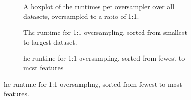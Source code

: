 \begin{figure}[h!]
\centering
\begin{subfigure}[b]{0.7\textwidth}
    \centering
    
    \caption{A boxplot of the runtimes per oversampler over all datasets, oversampled to a ratio of 1:1.}
    \label{fig:boxplot}
\end{subfigure}
\vfill
\begin{subfigure}[b]{0.7\textwidth}
    \centering
    
    \caption{The runtime for 1:1 oversampling, sorted from smallest to largest dataset.}
    \label{fig:runvfeat}
\end{subfigure}
\vfill
\begin{subfigure}[b]{0.7\textwidth}
    \centering
    
    \caption{he runtime for 1:1 oversampling, sorted from fewest to most features.}
    \label{fig:runvsize}
\end{subfigure}

\end{figure}
